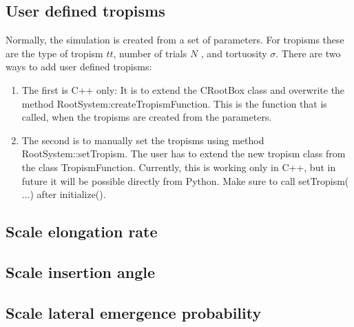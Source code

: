\documentclass[a4paper]{article}
\begin{document}
\subsection{User defined tropisms} \label{sec:usertropism}

Normally, the simulation is created from a set of parameters. For tropisms these are the type of tropism $tt$, number of trials $N$ , and tortuosity $\sigma$.
There are two ways to add user defined tropisms: 

\begin{enumerate}
 \item The first is C++ only: It is to extend the CRootBox class and overwrite the method RootSystem:createTropismFunction. 
This is the function that is called, when the tropisms are created from the parameters. 
\item The second is to manually set the tropisms using method RootSystem::setTropism. The user has to extend the new tropism class from the class TropismFunction. 
Currently, this is working only in C++, but in future it will be possible directly from Python. Make sure to call setTropism($\dots$) after initialize().
\end{enumerate}


\subsection{Scale elongation rate} \label{sec:elongation}



\subsection{Scale insertion angle} \label{sec:insertion}

\subsection{Scale lateral emergence probability} \label{sec:probabilistic}
\end{document}
